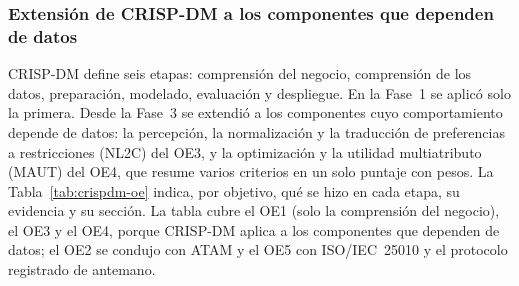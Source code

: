 \subsubsection{Extensión de CRISP-DM a los componentes que dependen de datos}
\label{sec:crispdm-extension}

CRISP-DM define seis etapas: comprensión del negocio, comprensión de los datos, preparación, modelado,
evaluación y despliegue. En la Fase~1 se aplicó solo la primera. Desde la Fase~3 se extendió a los componentes cuyo
comportamiento depende de datos: la percepción, la normalización y la traducción de preferencias a
restricciones (NL2C) del OE3, y la optimización y la utilidad multiatributo (MAUT) del OE4, que resume varios
criterios en un solo puntaje con pesos. La Tabla~\ref{tab:crispdm-oe} indica, por objetivo, qué se hizo en cada etapa, su evidencia y su sección. La tabla cubre el OE1 (solo la comprensión del negocio), el OE3 y el OE4, porque CRISP-DM aplica a los componentes que dependen de datos; el OE2 se condujo con ATAM y el OE5 con ISO/IEC~25010 y el protocolo registrado de antemano.\par

